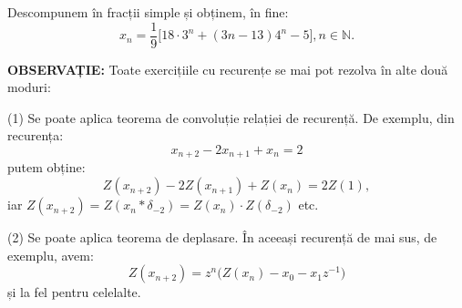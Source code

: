 Descompunem în fracții simple și obținem, în fine: 
\[
  x_n = \dfrac{1}{9} \big[ 18 \cdot 3^n + (3n - 13) 4^n - 5 \big], 
  n \in \mathbb{N}.
\]

\textbf{OBSERVAȚIE:} Toate exercițiile cu recurențe se mai pot rezolva în alte
două moduri:

(1) Se poate aplica teorema de convoluție relației de recurență. De exemplu,
din recurența:
\[
  x_{n + 2} - 2x_{n + 1} + x_n = 2
\]
putem obține:
\[
  Z(x_{n+2}) - 2Z(x_{n + 1}) + Z(x_n) = 2Z(1),
\]
iar $ Z(x_{n+2}) = Z(x_n \ast \delta_{-2}) = Z(x_n) \cdot Z(\delta_{-2}) $ etc.

(2) Se poate aplica teorema de deplasare. În aceeași recurență de mai sus,
de exemplu, avem:
\[
  Z(x_{n+2}) = z^n \Big( Z(x_n) - x_0 - x_1 z^{-1} \Big)
\]
și la fel pentru celelalte.


